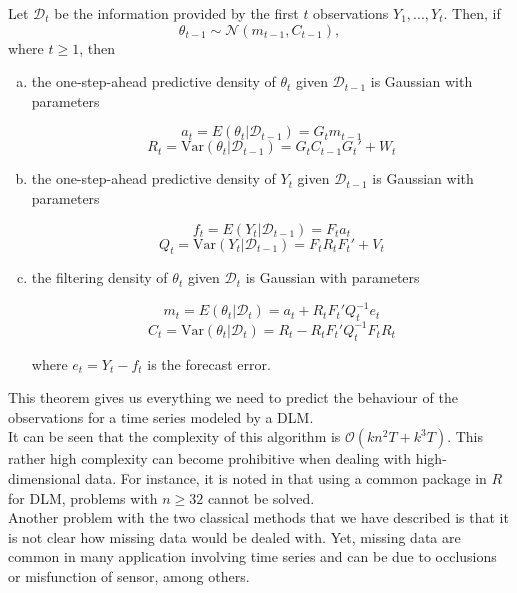 \documentclass{article}
\begin{document}
\begin{theorem}
Let $\mathcal{D}_t$ be the information provided by the first $t$ observations $Y_1, ..., Y_t$.
Then, if
$$\theta_{t-1} \sim \mathcal{N}(m_{t-1}, C_{t-1}),$$
where $t \ge 1$, then

\begin{enumerate}[(a)]

\item the one-step-ahead predictive density of $\theta_t$ given $\mathcal{D}_{t-1}$ is Gaussian with parameters

$$a_t = E(\theta_t|\mathcal{D}_{t-1}) = G_tm_{t-1}$$
$$R_t = \text{Var}(\theta_t|\mathcal{D}_{t-1}) = G_tC_{t-1}G_t' + W_t$$

\item the one-step-ahead predictive density of $Y_t$ given $\mathcal{D}_{t-1}$ is Gaussian with parameters

$$f_t = E(Y_t|\mathcal{D}_{t-1}) = F_ta_t$$
$$Q_t = \text{Var}(Y_t|\mathcal{D}_{t-1}) = F_tR_tF_t' + V_t$$

\item the filtering density of $\theta_t$ given $\mathcal{D}_t$ is Gaussian with parameters

$$m_t = E(\theta_t|\mathcal{D}_{t}) = a_t + R_tF_t'Q_t^{-1}e_t$$
$$C_t = \text{Var}(\theta_t|\mathcal{D}_{t}) = R_t - R_tF_t'Q_t^{-1}F_tR_t$$

where $e_t = Y_t-f_t$ is the forecast error.

\end{enumerate}

\end{theorem}

This theorem gives us everything we need to predict the behaviour of the observations for a time series modeled by a DLM. \\

It can be seen that the complexity of this algorithm is $\mathcal{O}(kn^2T + k^3T)$.
This rather high complexity can become prohibitive when dealing with high-dimensional data. For instance, it is noted in \cite{TRMF} that using a common package in $R$ for DLM, problems with $n \ge 32$ cannot be solved. \\

Another problem with the two classical methods that we have described is that it is not clear how missing data would be dealed with. Yet, missing data are common in many application involving time series and can be due to occlusions or misfunction of sensor, among others. \\
\end{document}
